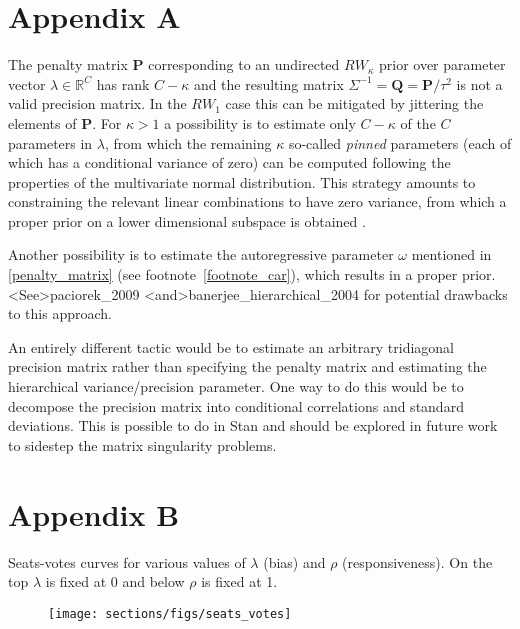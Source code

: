 

\chapter[Improper priors]{Appendix A} \label{AppendixA}

The penalty matrix $\mathbf{P}$ corresponding to an undirected $RW_\kappa$ prior over parameter vector $\lambda \in \mathbb{R}^C$ has rank $C - \kappa$ and the resulting matrix $\Sigma^{-1} = \mathbf{Q} = \mathbf{P}/\tau^2$ is not a valid precision matrix. In the $RW_1$ case this can be mitigated by jittering the elements of $\mathbf{P}$. For $\kappa > 1$ a possibility is to estimate only $C - \kappa$ of the $C$ parameters in $\lambda$,  from which the remaining $\kappa$ so-called {\it pinned} parameters (each of which has a conditional variance of zero) can be computed following the properties of the multivariate normal distribution. This strategy amounts to  constraining the relevant linear combinations to have zero variance, from which a proper prior on a lower dimensional subspace is obtained . 

Another possibility is to estimate the autoregressive parameter $\omega$ mentioned in \ref{penalty_matrix} (see footnote~\ref{footnote_car}), which results in a proper prior. \citeA<See>{paciorek_2009} \citeA<and>{banerjee_hierarchical_2004} for potential drawbacks to this approach.

An entirely different tactic would be to estimate an arbitrary tridiagonal precision matrix rather than specifying the penalty matrix and estimating the hierarchical variance/precision parameter. One way to do this would be to decompose the precision matrix into conditional correlations and standard deviations. This is possible to do in Stan and should be explored in future work to sidestep the matrix singularity problems. 


\clearpage
\chapter[Seats-votes curves]{Appendix B}\label{AppendixB}

Seats-votes curves for various values of $\lambda$ (bias) and $\rho$ (responsiveness). On the top $\lambda$ is fixed at 0 and below $\rho$ is fixed at 1.


\begin{figure}[h]
\centering
	\texttt{[image: sections/figs/seats\_votes]}
\label{fig:seats_votes}
\end{figure}


